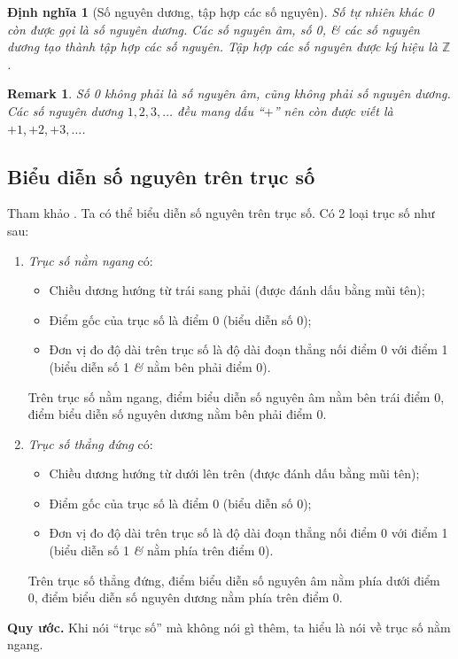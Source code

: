 \documentclass[oneside]{book}
\numberwithin{equation}{section}
\newtheorem{dinhnghia}{Định nghĩa}[section]
\newtheorem{remark}{Remark}[section]
\begin{document}
\begin{dinhnghia}[Số nguyên dương, tập hợp các số nguyên]
	Số tự nhiên khác 0 còn được gọi là \emph{số nguyên dương}. Các số nguyên âm, số 0, \textit{\&} các số nguyên dương tạo thành tập hợp các số nguyên. Tập hợp các số nguyên được ký hiệu là $\mathbb{Z}$.
\end{dinhnghia}

\begin{remark}
	Số 0 không phải là số nguyên âm, cũng không phải số nguyên dương. Các số nguyên dương $1,2,3,\ldots$ đều mang dấu ``$+$'' nên còn được viết là $+1,+2,+3,\ldots$.
\end{remark}

\subsection{Biểu diễn số nguyên trên trục số}
Tham khảo \cite[pp. 65--66]{Thai_Anh_Dat_Ha_Loan_Nam_Quang_Toan_6_tap_1}. Ta có thể biểu diễn số nguyên trên trục số. Có 2 loại trục số như sau:
\begin{enumerate}
	\item \textit{Trục số nằm ngang} có:
	\begin{itemize}
		\item Chiều dương hướng từ trái sang phải (được đánh dấu bằng mũi tên);
		\item Điểm gốc của trục số là điểm 0 (biểu diễn số 0);
		\item Đơn vị đo độ dài trên trục số là độ dài đoạn thẳng nối điểm 0 với điểm 1 (biểu diễn số 1 \textit{\&} nằm bên phải điểm 0).
	\end{itemize}
	Trên trục số nằm ngang, điểm biểu diễn số nguyên âm nằm bên trái điểm 0, điểm biểu diễn số nguyên dương nằm bên phải điểm 0.
	\item \textit{Trục số thẳng đứng} có:
	\begin{itemize}
		\item Chiều dương hướng từ dưới lên trên (được đánh dấu bằng mũi tên);
		\item Điểm gốc của trục số là điểm 0 (biểu diễn số 0);
		\item Đơn vị đo độ dài trên trục số là độ dài đoạn thẳng nối điểm 0 với điểm 1 (biểu diễn số 1 \textit{\&} nằm phía trên điểm 0).
	\end{itemize}
	Trên trục số thẳng đứng, điểm biểu diễn số nguyên âm nằm phía dưới điểm 0, điểm biểu diễn số nguyên dương nằm phía trên điểm 0.
\end{enumerate}
\noindent\textbf{Quy ước.} Khi nói ``trục số'' mà không nói gì thêm, ta hiểu là nói về trục số nằm ngang.
\end{document}
